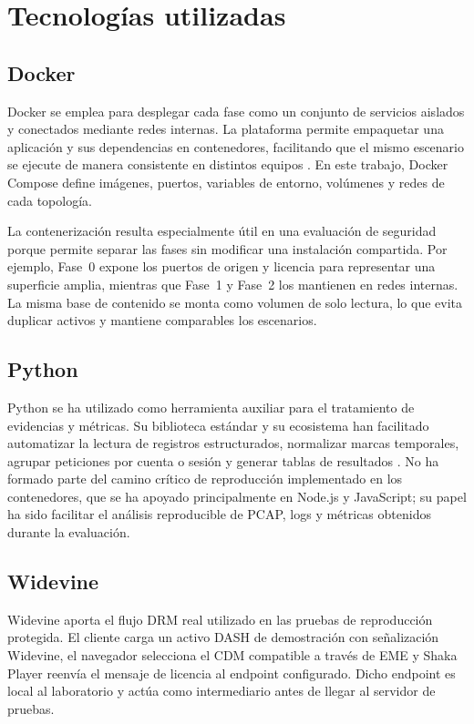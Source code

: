\section{Tecnologías utilizadas}

\subsection{Docker}

Docker se emplea para desplegar cada fase como un conjunto de servicios aislados y conectados mediante redes internas. La plataforma permite empaquetar una aplicación y sus dependencias en contenedores, facilitando que el mismo escenario se ejecute de manera consistente en distintos equipos \cite{docker-docs2026}. En este trabajo, Docker Compose define imágenes, puertos, variables de entorno, volúmenes y redes de cada topología.

La contenerización resulta especialmente útil en una evaluación de seguridad porque permite separar las fases sin modificar una instalación compartida. Por ejemplo, Fase~0 expone los puertos de origen y licencia para representar una superficie amplia, mientras que Fase~1 y Fase~2 los mantienen en redes internas. La misma base de contenido se monta como volumen de solo lectura, lo que evita duplicar activos y mantiene comparables los escenarios.

\subsection{Python}

Python se ha utilizado como herramienta auxiliar para el tratamiento de evidencias y métricas. Su biblioteca estándar y su ecosistema han facilitado automatizar la lectura de registros estructurados, normalizar marcas temporales, agrupar peticiones por cuenta o sesión y generar tablas de resultados \cite{python-docs2026}. No ha formado parte del camino crítico de reproducción implementado en los contenedores, que se ha apoyado principalmente en Node.js y JavaScript; su papel ha sido facilitar el análisis reproducible de PCAP, logs y métricas obtenidos durante la evaluación.

\subsection{Widevine}

Widevine aporta el flujo DRM real utilizado en las pruebas de reproducción protegida. El cliente carga un activo DASH de demostración con señalización Widevine, el navegador selecciona el CDM compatible a través de EME y Shaka Player reenvía el mensaje de licencia al endpoint configurado. Dicho endpoint es local al laboratorio y actúa como intermediario antes de llegar al servidor de pruebas.

